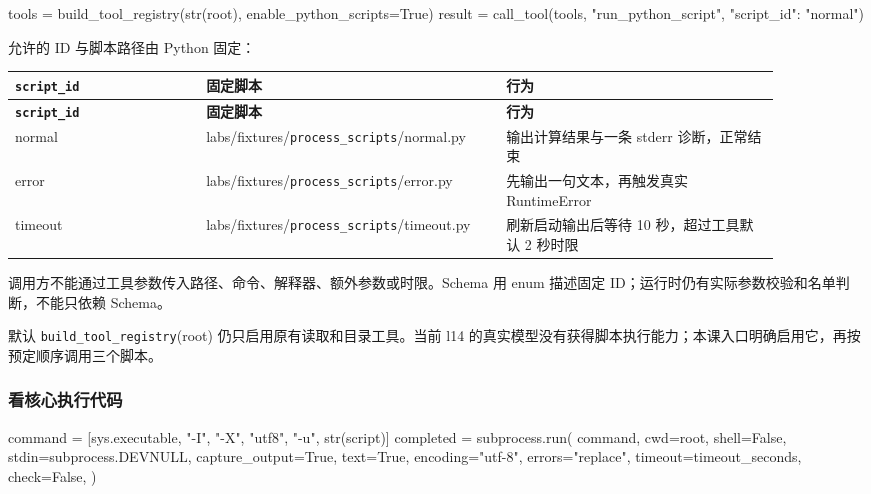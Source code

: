 \documentclass[UTF8,zihao=-4,fontset=fandol]{ctexart}
\begin{document}
\begin{Code}
tools = build_tool_registry(str(root), enable_python_scripts=True)
result = call_tool(tools, "run_python_script", {"script_id": "normal"})
\end{Code}

允许的 ID 与脚本路径由 Python 固定：

{\small\setlength{\tabcolsep}{4pt}
\renewcommand{\arraystretch}{1.25}
\begin{longtable}{>{\raggedright\arraybackslash}p{0.23\linewidth}>{\raggedright\arraybackslash}p{0.33\linewidth}>{\raggedright\arraybackslash}p{0.33\linewidth}}
\toprule
\textbf{\nolinkurl{script_id}} & \textbf{固定脚本} & \textbf{行为} \\
\midrule\endfirsthead
\toprule
\textbf{\nolinkurl{script_id}} & \textbf{固定脚本} & \textbf{行为} \\
\midrule\endhead
\bottomrule\endfoot
normal & labs/fixtures/\nolinkurl{process_scripts}/normal.py & 输出计算结果与一条 stderr 诊断，正常结束 \\
error & labs/fixtures/\nolinkurl{process_scripts}/error.py & 先输出一句文本，再触发真实 RuntimeError \\
timeout & labs/fixtures/\nolinkurl{process_scripts}/timeout.py & 刷新启动输出后等待 10 秒，超过工具默认 2 秒时限 \\
\end{longtable}}

调用方不能通过工具参数传入路径、命令、解释器、额外参数或时限。Schema 用 enum 描述固定 ID；运行时仍有实际参数校验和名单判断，不能只依赖 Schema。

默认 \nolinkurl{build_tool_registry}(root) 仍只启用原有读取和目录工具。当前 l14 的真实模型没有获得脚本执行能力；本课入口明确启用它，再按预定顺序调用三个脚本。

\subsubsection{看核心执行代码}

\begin{Code}
command = [sys.executable, "-I", "-X", "utf8", "-u", str(script)]
completed = subprocess.run(
    command,
    cwd=root,
    shell=False,
    stdin=subprocess.DEVNULL,
    capture_output=True,
    text=True,
    encoding="utf-8",
    errors="replace",
    timeout=timeout_seconds,
    check=False,
)
\end{Code}
\end{document}
